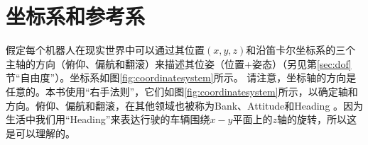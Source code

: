 \section{坐标系和参考系}\label{sec:coordsystems}


假定每个机器人在现实世界中可以通过其位置$(x, y, z)$和沿笛卡尔坐标系的三个主轴的方向（俯仰、偏航和翻滚）来描述其位姿（位置+姿态）（另见第\ref{sec:dof}节“自由度”）。坐标系如图\ref{fig:coordinatesystem}所示。 请注意，坐标轴的方向是任意的。本书使用“右手法则”，它们如图\ref {fig:coordinatesystem}所示，以确定轴和方向。俯仰、偏航和翻滚，在其他领域也被称为Bank、Attitude和Heading   。因为生活中我们用“Heading”来表达行驶的车辆围绕$x-y$平面上的$z$轴的旋转，所以这是可以理解的。

